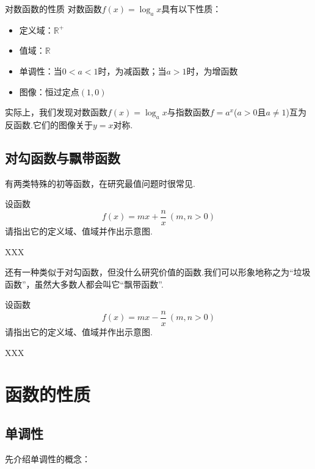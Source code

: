 \documentclass[lang=cn, zihao=4.5]{elegantbook}
\begin{document}
\begin{proposition}{对数函数的性质}
    对数函数$f(x)=\log_{a}{x}$具有以下性质：
    \begin{itemize}
        \item 定义域：$\mathbb{R}^{+}$
        \item 值域：$\mathbb{R}$
        \item 单调性：当$0<a<1$时，为减函数；当$a>1$时，为增函数
        \item 图像：恒过定点$(1,0)$
    \end{itemize}
\end{proposition}


实际上，我们发现对数函数$f(x)=\log_{a}{x}$与指数函数$f=a^{x}$($a>0$且$a \neq 1$)互为反函数.它们的图像关于$y=x$对称.

\subsection{对勾函数与飘带函数}

有两类特殊的初等函数，在研究最值问题时很常见.

\begin{problem}
    设函数$$f(x)=mx+\frac{n}{x}~(m,n>0)$$
    请指出它的定义域、值域并作出示意图.
\end{problem}
\begin{solution}
    XXX
\end{solution}

还有一种类似于对勾函数，但没什么研究价值的函数.我们可以形象地称之为“垃圾函数”，虽然大多数人都会叫它“飘带函数”.

\begin{problem}
    设函数$$f(x)=mx-\frac{n}{x}~(m,n>0)$$
    请指出它的定义域、值域并作出示意图.
\end{problem}
\begin{solution}
    XXX
\end{solution}

\section{函数的性质}

\subsection{单调性}

先介绍单调性的概念：
\end{document}
